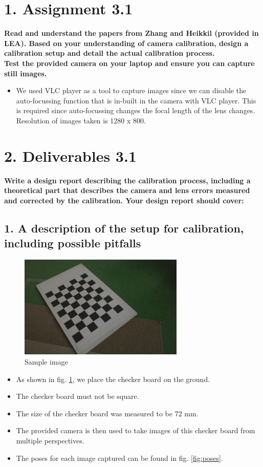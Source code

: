 \section*{1. Assignment 3.1}
\textbf{Read and understand the papers from Zhang and Heikkil (provided in LEA). Based on your understanding of camera calibration, design a calibration setup and detail the actual calibration process. \\
Test the provided camera on your laptop and ensure you can capture still images.}

\begin{itemize}
\item We used VLC player as a tool to capture images since we can disable the auto-focussing function that is in-built in the camera with VLC player. This is required since auto-focussing changes the focal length of the lens changes. Resolution of images taken is 1280 x 800.
\end{itemize}

\section*{2. Deliverables 3.1}
\textbf{Write a design report describing the calibration process, including a theoretical part that describes the camera and lens errors measured and corrected by the calibration. Your design report should cover:}

\subsection*{1. A description of the setup for calibration, including possible pitfalls}
\begin{figure}[H]
\begin{center}
\includegraphics[width=0.7\textwidth]{data/1.jpg}
\caption{Sample image}
\label{fig:sample}
\end{center}
\end{figure}
\begin{itemize}
\item As shown in fig. \ref{fig:sample}, we place the checker board on the ground.
\item The checker board must not be square.
\item The size of the checker board was measured to be $72$ mm.
\item The provided camera is then used to take images of this checker board from multiple perspectives.
\item The poses for each image captured can be found in fig. \ref{fig:poses}.
\end{itemize}

